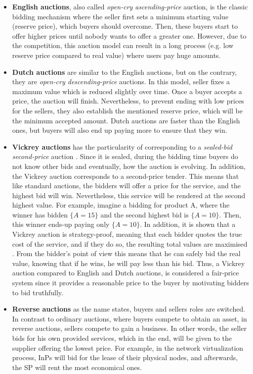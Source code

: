 \begin{itemize}
	\item \textbf{English auctions}, also called \textit{open-cry ascending-price} auction, is the classic bidding mechanism where the seller first sets a minimum starting value (reserve price), which buyers should overcome. Then, these buyers start to offer higher prices until nobody wants to offer a greater one. However, due to the competition, this auction model can result in a long process (e.g. low reserve price compared to real value) where users pay huge amounts.
	\item \textbf{Dutch auctions} are similar to the English auctions, but on the contrary, they are \textit{open-cry descending-price} auctions. In this model, seller fixes a maximum value which is reduced slightly over time. Once a buyer accepts a price, the auction will finish. Nevertheless, to prevent ending with low prices for the sellers, they also establish the mentioned reserve price, which will be the minimum accepted amount. Dutch auctions are faster than the English ones, but buyers will also end up paying more to ensure that they win.
	\item \textbf{Vickrey auctions} has the particularity of corresponding to a \textit{sealed-bid second-price} auction \cite{vickrey1961counterspeculation}. Since it is sealed, during the bidding time buyers do not know other bids and eventually, how the auction is evolving. In addition, the Vickrey auction corresponds to a second-price tender. This means that like standard auctions, the bidders will offer a price for the service, and the highest bid will win. Nevertheless, this service will be rendered at the second highest value. For example, imagine a bidding for product A, where the winner has bidden $\{A = 15\}$ and the second highest bid is $\{A = 10\}$. Then, this winner ends-up paying only $\{A = 10\}$. In addition, it is shown that a Vickrey auction is strategy-proof, meaning that each bidder quotes the true cost of the service, and if they do so, the resulting total values are maximised  \cite{vickrey1961counterspeculation}. From the bidder's point of view this means that he can safely bid the real value, knowing that if he wins, he will pay less than his bid. Thus, a Vickrey auction compared to English and Dutch auctions, is considered a fair-price system since it provides a reasonable price to the buyer by motivating bidders to bid truthfully.
	\item \textbf{Reverse auctions} as the name states, buyers and sellers roles are switched. In contrast to ordinary auctions, where buyers compete to obtain an asset, in reverse auctions, sellers compete to gain a business. In other words, the seller bids for his own provided services, which in the end, will be given to the supplier offering the lowest price. For example, in the network virtualization process, InPs will bid for the lease of their physical nodes, and afterwards, the SP will rent the most economical ones.
\end{itemize}

